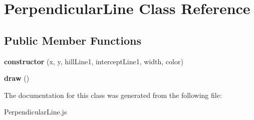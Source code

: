 \hypertarget{class_perpendicular_line}{}\section{Perpendicular\+Line Class Reference}
\label{class_perpendicular_line}
\subsection*{Public Member Functions}
\begin{DoxyCompactItemize}
\item 
\mbox{\label{class_perpendicular_line_aabe2c5cf6c21499b4abad08c78b20eda}} 
{\bfseries constructor} (x, y, hill\+Line1, intercept\+Line1, width, color)
\item 
\mbox{\label{class_perpendicular_line_aee0271aafa2a8a893f73416cf3c1cbe7}} 
{\bfseries draw} ()
\end{DoxyCompactItemize}


The documentation for this class was generated from the following file\+:\begin{DoxyCompactItemize}
\item 
Perpendicular\+Line.\+js\end{DoxyCompactItemize}
